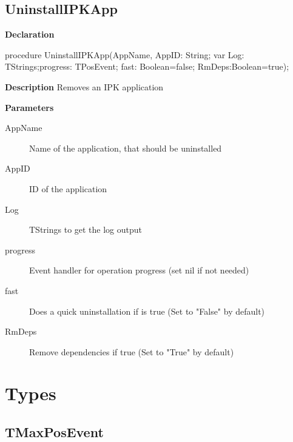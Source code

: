 \documentclass{report}
\newif\ifpdf
\begin{document}
\subsection*{UninstallIPKApp}
\fi
\label{ipkhandle-UninstallIPKApp}
\begin{list}{}{
\setlength{\itemindent}{0cm}
\setlength{\listparindent}{0cm}
\setlength{\leftmargin}{\evensidemargin}
\addtolength{\leftmargin}{\tmplength}
\settowidth{\labelsep}{X}
\addtolength{\leftmargin}{\labelsep}
\setlength{\labelwidth}{\tmplength}
}
\item[\textbf{Declaration}\hfill]
\ifpdf
\begin{flushleft}
\fi
\begin{ttfamily}
procedure UninstallIPKApp(AppName, AppID: String; var Log: TStrings;progress: TPosEvent; fast: Boolean=false; RmDeps:Boolean=true);\end{ttfamily}

\ifpdf
\end{flushleft}
\fi

\par
\item[\textbf{Description}]
Removes an IPK application      \par
\item[\textbf{Parameters}]
\begin{description}
\item[AppName] Name of the application, that should be uninstalled
\item[AppID] ID of the application
\item[Log] TStrings to get the log output
\item[progress] Event handler for operation progress (set nil if not needed)
\item[fast] Does a quick uninstallation if is true (Set to "False" by default)
\item[RmDeps] Remove dependencies if true (Set to "True" by default)
\end{description}


\end{list}
\section{Types}
\ifpdf
\subsection*{\large{\textbf{TMaxPosEvent}}\normalsize\hspace{1ex}\hrulefill}
\else
\end{document}
